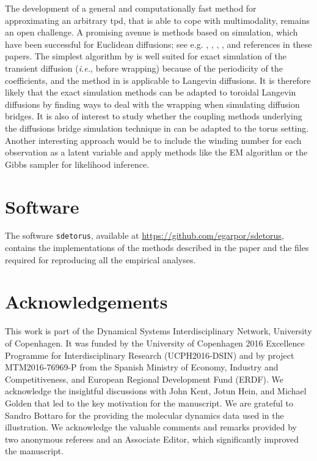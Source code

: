\documentclass[oneside,11pt]{article}
\begin{document}
The development of a general and computationally fast method
for approximating an arbitrary tpd, that is able to cope with multimodality,
remains an open challenge. A promising avenue is methods based on
simulation, which have been successful for Euclidean diffusions; see e.g.
\cite{Beskos2006}, \cite{Papaspiliopoulos2012}, \cite{Sermaidis2012}, \cite{Bladt2016},
and references in these papers. The simplest algorithm by \cite{Beskos2006a} is well suited for exact simulation of the transient diffusion (\textit{i.e.}, before wrapping) because of the periodicity
of the coefficients, and the method in \cite{Sermaidis2012} is applicable
to Langevin diffusions. It is therefore likely that the exact
simulation methods can be adapted to toroidal Langevin diffusions
by finding ways to deal with the wrapping when simulating diffusion
bridges. It is also of interest to study whether the coupling methods
underlying the diffusions bridge simulation technique in
\cite{Bladt2016} can be adapted to the torus setting.
Another interesting approach would be to include the winding number
for each observation as a latent variable and apply methods like the
EM algorithm or the Gibbs sampler for likelihood inference.

\section*{Software}
\label{sec:soft}

The software \texttt{sdetorus}, available at \url{https://github.com/egarpor/sdetorus}, contains the implementations of the methods described in the paper and the files required for reproducing all the empirical analyses.

\section*{Acknowledgements}

This work is part of the Dynamical Systems Interdisciplinary Network, University of Copenhagen. It was funded by the University of Copenhagen 2016 Excellence Programme for Interdisciplinary Research (UCPH2016-DSIN) and by project MTM2016-76969-P from the Spanish Ministry of Economy, Industry and Competitiveness, and European Regional Development Fund (ERDF). We acknowledge the insightful discussions with John Kent, Jotun Hein, and Michael Golden that led to the key motivation for the manuscript. We are grateful to Sandro Bottaro for the providing the molecular dynamics data used in the illustration. We acknowledge the valuable comments and remarks provided by two anonymous referees and an Associate Editor, which significantly improved the manuscript.
\end{document}
